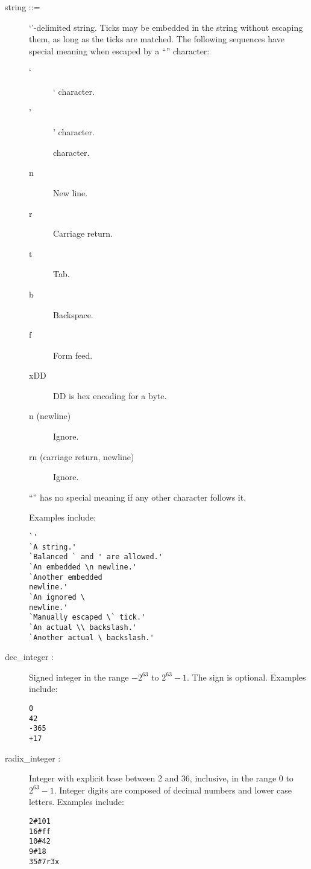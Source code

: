 \begin{description}
\item[{\lt}string{\gt} ::= ] `'-delimited string.  Ticks may
be embedded in the string without escaping them, as long as the ticks are
matched.  The following sequences have special meaning when escaped by a
``{\bs}'' character:
	\begin{description}
	\item[` ] ` character.
	\item[' ] ' character.
	\item[{\bs} ] {\bs} character.
	\item[n ] New line.
	\item[r ] Carriage return.
	\item[t ] Tab.
	\item[b ] Backspace.
	\item[f ] Form feed.
	\item[xDD ] DD is hex encoding for a byte.
	\item[{\bs}n (newline) ] Ignore.
	\item[{\bs}r{\bs}n (carriage return, newline) ] Ignore.
	\end{description}

``{\bs}'' has no special meaning if any other character follows it.

Examples include:
\begin{verbatim}
`'
`A string.'
`Balanced ` and ' are allowed.'
`An embedded \n newline.'
`Another embedded 
newline.'
`An ignored \
newline.'
`Manually escaped \` tick.'
`An actual \\ backslash.'
`Another actual \ backslash.'
\end{verbatim}

\item[{\lt}dec\_integer{\gt} : ] Signed integer in the range $-2^{63}$ to
$2^{63} - 1$.  The sign is optional.  Examples include:
\begin{verbatim}
0
42
-365
+17
\end{verbatim}

\item[{\lt}radix\_integer{\gt} : ] Integer with explicit base between 2 and 36,
inclusive, in the range $0$ to $2^{63} - 1$.  Integer digits are composed of
decimal numbers and lower case letters.  Examples include:
\begin{verbatim}
2#101
16#ff
10#42
9#18
35#7r3x
\end{verbatim}

\end{description}

